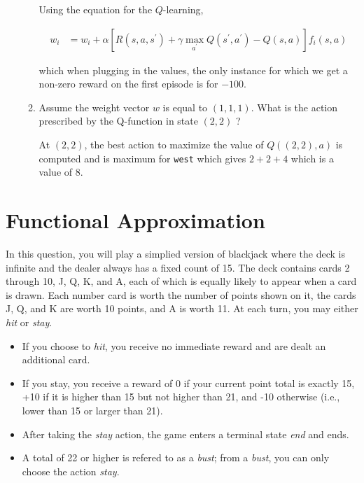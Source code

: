 \documentclass[12pt]{article}
\begin{document}
\begin{enumerate}
\begin{enumerate}
  Using the equation for the $Q$-learning,

  \begin{align*}
    w_{i} &= w_{i} + \alpha\left[R(s,a,s^{\prime}) + \gamma\max_{a^{\prime}}Q(s^{\prime},a^{\prime}) - Q(s,a)\right]f_{i}(s,a)
    \end{align*}

    which when plugging in the values, the only instance for which we get a non-zero reward on the first episode is for $-100$.

  \item Assume the weight vector $w$ is equal to $(1, 1, 1)$.  What is
  the action prescribed by the Q-function in state $(2,2)$ ?

At $(2,2)$, the best action to maximize the value of $Q((2,2),a)$ is computed and is maximum for {\tt west} which gives $2+2+4$ which is a value of $8$.

  \end{enumerate}

\end{enumerate}

\clearpage

\section{Functional Approximation}

In this question, you will play a simplied version of blackjack where
the deck is infinite and the dealer always has a fixed count of 15.
The deck contains cards 2 through 10, J, Q, K, and A, each of which is
equally likely to appear when a card is drawn.  Each number card is
worth the number of points shown on it, the cards J, Q, and K are
worth 10 points, and A is worth 11.  At each turn, you may either {\it
  hit} or {\it stay}.

\begin{itemize}

\item If you choose to {\it hit}, you receive no immediate reward and
  are dealt an additional card.  

\item If you stay, you receive a reward of 0 if your current point
  total is exactly 15, +10 if it is higher than 15 but not higher than
  21, and -10 otherwise (i.e., lower than 15 or larger than 21).

\item After taking the {\it stay} action, the game enters a terminal
  state {\it end} and ends.

\item A total of 22 or higher is refered to as a {\it bust}; from a
  {\it bust}, you can only choose the action {\it stay}.

\end{itemize}
\end{document}
